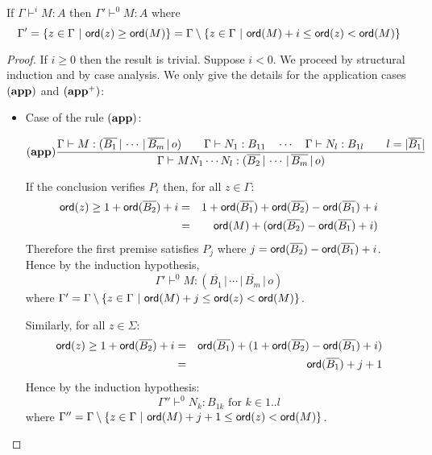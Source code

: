 \begin{lem}
\label{lem:restriction}

If $\Gamma \vdash^i M : A$ then $\Gamma' \vdash^{0} M : A$
where $$\Gamma' = \{ z \in \Gamma \ |
\ \ord{z} \geq \ord{M} \} = \Gamma \setminus \{ z \in \Gamma \ | \ \ord{M} + i \leq \ord{z} < \ord{M} \}$$
\end{lem}
\begin{proof}
If $i\geq 0$ then the result is trivial.
Suppose $i<0$. We proceed by structural induction and by case analysis.
We only give the details for the application cases $\mathbf{(app)}$ and $\mathbf{(app^+)}$:
\begin{itemize}
\item Case of the rule $\mathbf{(app)}$:

    \[ (\mathbf{app})
    \frac{\displaystyle {{\Gamma} \vdash {M : (\overline{B_1} \, | \, \cdots \, | \, \overline{B_m} \, | \, o)}} \qquad
            {{\Gamma} \vdash {N_1 : B_{11}}} \quad \cdots \quad {{\Gamma} \vdash {N_{l} :
            B_{1l}}} \qquad l = |\overline{B_1}| }{ {{\Gamma} \vdash {M N_1
            \cdots N_{l} : (\overline{B_2} \, | \, \cdots \, | \,
            \overline{B_m} \, | \, o)}}}
    \]

    If the conclusion verifies $P_i$ then, for all $z \in \Gamma$:
    \begin{eqnarray*}
    {\sf ord}(z) \geq 1 + {\sf ord}(\overline{B_2}) + i
    &=& 1 + {\sf ord}(\overline{B_1}) + {\sf ord}(\overline{B_2}) - {\sf ord}(\overline{B_1}) + i \\
    &=& {\sf ord}(M) + ({\sf ord}(\overline{B_2}) - {\sf ord}(\overline{B_1}) + i)
    \end{eqnarray*}
    Therefore the first premise satisfies $P_j$ where $j={{\sf ord}(\overline{B_2}) - {\sf ord}(\overline{B_1}) + i}$.
    Hence by the induction hypothesis,
    $$\Gamma' \vdash^{0} M : (\overline{B_1} \, | \, \cdots \, | \, \overline{B_m} \, | \, o)$$
    where $\Gamma' = \Gamma \setminus \{ z \in \Gamma \ | \ {\sf ord}(M) + j \leq {\sf ord}(z) < {\sf ord}(M) \}$.


    Similarly, for all $z \in \Sigma$:
    \begin{eqnarray*}
    {\sf ord}(z) \geq 1 + {\sf ord}(\overline{B_2}) + i
    &=& {\sf ord}(\overline{B_1}) + (1+{\sf ord}(\overline{B_2}) - {\sf ord}(\overline{B_1}) + i) \\
    &=& {\sf ord}(\overline{B_1}) + j+1
    \end{eqnarray*}
    Hence by the induction hypothesis:
    $$\Gamma'' \vdash^0 N_k : B_{1k} \mbox{ for } k \in 1..l$$
    where $\Gamma'' = \Gamma \setminus \{ z \in \Gamma \ | \ {\sf ord}(M) + j+1 \leq {\sf ord}(z) < {\sf ord}(M) \}$.


\end{itemize}
\end{proof}
